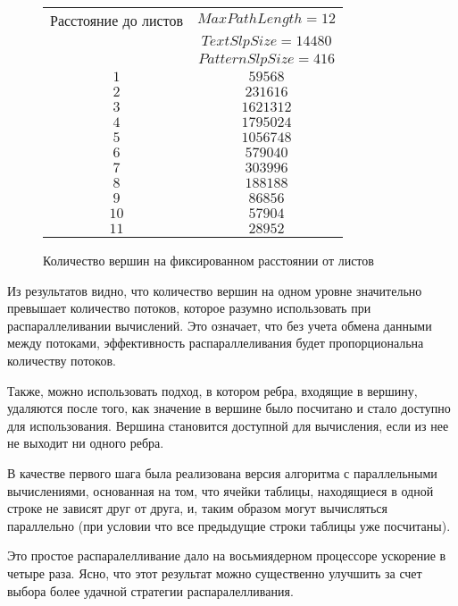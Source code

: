 \documentclass[14pt]{article}
\begin{document}
\begin{figure}[H]
    \begin{center}
    \begin{tabular}{ | c | c |}

    \hline
         Расстояние до листов & $Max Path Length = 12$  \\
          & $TextSlp Size = 14480$  \\
          & $PatternSlp Size = 416$  \\            
    \hline
    $1$ & $59568$ \\
    \hline
    $2$ & $231616$ \\
    \hline
    $3$ & $1621312$ \\
    \hline
    $4$ & $1795024$ \\
    \hline
    $5$ & $1056748$ \\
    \hline
    $6$ & $579040$ \\
    \hline
    $7$ & $303996$ \\
    \hline
    $8$ & $188188$ \\
    \hline
    $9$ & $86856$ \\
    \hline
    $10$ & $57904$ \\
    \hline
    $11$ & $28952$ \\
    \hline
    \end{tabular}
    \end{center}
    \caption{Количество вершин на фиксированном расстоянии от листов}
    \label{layers}
\end{figure}

Из результатов видно, что количество вершин на одном уровне значительно превышает количество потоков, которое разумно использовать при распараллеливании вычислений. Это означает, что без учета обмена данными между потоками, эффективность распараллеливания будет пропорциональна количеству потоков. 

Также, можно использовать подход, в котором ребра, входящие в вершину, удаляются после того, как значение в вершине было посчитано и стало доступно для использования. Вершина становится доступной для вычисления, если из нее не выходит ни одного ребра.

В качестве первого шага была реализована версия алгоритма с параллельными вычислениями, основанная на том, что ячейки таблицы, находящиеся в одной строке не зависят друг от друга, и, таким образом могут вычисляться параллельно (при условии что все предыдущие строки таблицы уже посчитаны).

Это простое распаралелливание дало на восьмиядерном процессоре ускорение в четыре раза. Ясно, что этот результат можно существенно улучшить за счет выбора более удачной стратегии распаралелливания.
\end{document}
